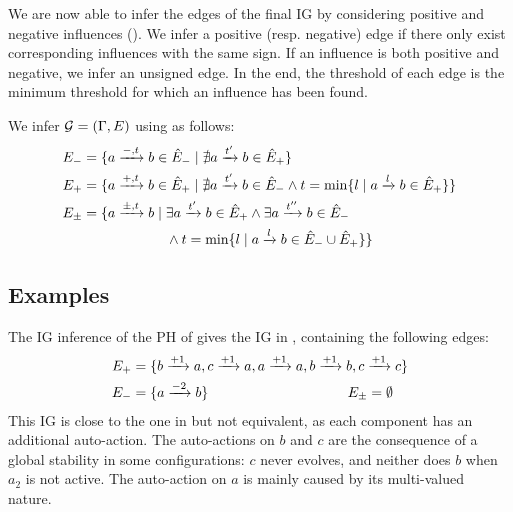 We are now able to infer the edges of the final IG by considering positive and negative influences
().
We infer a positive (resp. negative) edge if there only exist corresponding influences with the same sign.
If an influence is both positive and negative, we infer an unsigned edge.
In the end, the threshold of each edge is the minimum threshold for which an influence has been found.
%
\begin{proposition}\label{pps:inference-IG}
We infer $\mathcal{G} = (\Gamma,E)$ using  as follows:
\begin{align*}
E_- &= \{ a \xrightarrow{-, t} b \in \hat E_- \mid \nexists a \xrightarrow{t'} b
\in \hat{E}_+ \} \\
E_+ &= \{ a \xrightarrow{+, t} b \in \hat E_+ \mid \nexists a \xrightarrow{t'} b \in \hat{E}_-
  \wedge t = \min \{ l \mid a \xrightarrow{l} b \in \hat{E}_+\}\} \\
E_\pm &= \{ a \xrightarrow{\pm, t} b \mid \exists a \xrightarrow{t'} b \in \hat{E}_+ \wedge \exists a \xrightarrow{t''} b \in \hat{E}_- \\
  & \qquad\qquad\qquad \wedge t = \min \{l \mid a \xrightarrow{l} b \in \hat{E}_- \cup \hat{E}_+\}\}
\end{align*}
\end{proposition}


\subsection{Examples}
\label{ssec:infer-ig-examples}

The IG inference of the PH of  gives the
IG in , containing the following edges:
\begin{align*}
  E_+ &= \{b \xrightarrow{+ 1} a, c \xrightarrow{+ 1} a, a \xrightarrow{+ 1} a, b \xrightarrow{+ 1} b, c \xrightarrow{+ 1} c\}\\
  E_- &= \{a \xrightarrow{- 2} b\} \qquad\qquad\qquad\qquad\qquad
  E_\pm = \emptyset
\end{align*}
This IG is close to the one in  but not equivalent,
as each component has an additional auto-action.
The auto-actions on $b$ and $c$ are the consequence of a global stability
in some configurations: $c$ never evolves, and neither does $b$ when $a_2$ is not active.
The auto-action on $a$ is mainly caused by its multi-valued nature.

